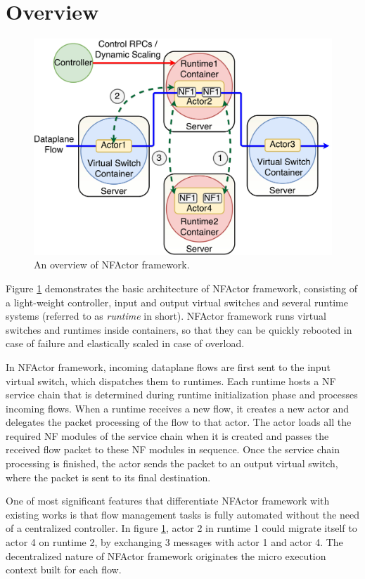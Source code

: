\section {Overview}

\begin{figure}[!t]
  \centering
  \includegraphics[width=\columnwidth]{figure/final-final-nfactor-cluster.pdf}
  \caption{An overview of NFActor framework.}
  \label{fig:runtime}
\end{figure}

Figure \ref{fig:runtime} demonstrates the basic architecture of NFActor framework, consisting of a light-weight controller, input and output virtual switches and several runtime systems (referred to as \textit{runtime} in short). NFActor framework runs virtual switches and runtimes inside containers, so that they can be quickly rebooted in case of failure and elastically scaled in case of overload.

In NFActor framework, incoming dataplane flows are first sent to the input virtual switch, which dispatches them to runtimes. Each runtime hosts a NF service chain that is determined during runtime initialization phase and processes incoming flows. When a runtime receives a new flow, it creates a new actor and delegates the packet processing of the flow to that actor. The actor loads all the required NF modules of the service chain when it is created and passes the received flow packet to these NF modules in sequence. Once the service chain processing is finished, the actor sends the packet to an output virtual switch, where the packet is sent to its final destination.

One of most significant features that differentiate NFActor framework with existing works \cite{gember2015opennf} is that flow management tasks is fully automated without the need of a centralized controller. In figure \ref{fig:runtime}, actor 2 in runtime 1 could migrate itself to actor 4 on runtime 2, by exchanging 3 messages with actor 1 and actor 4. The decentralized nature of NFActor framework originates the micro execution context built for each flow.

